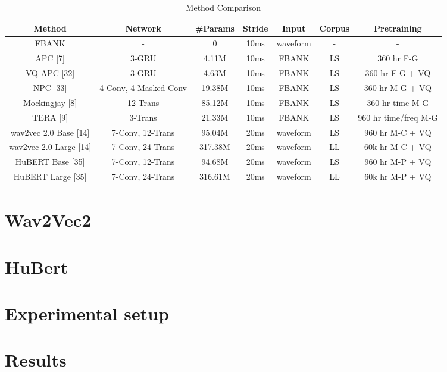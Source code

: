 \begin{table}[htbp]
    \centering
    \caption{Method Comparison}
    \label{tab:methods}
    \begin{tabular}{ccccccc}
      \toprule
      Method & Network & \#Params & Stride & Input & Corpus & Pretraining \\
      \midrule
      FBANK & - & 0 & 10ms & waveform & - & - \\
      APC [7] & 3-GRU & 4.11M & 10ms & FBANK & LS & 360 hr F-G \\
      VQ-APC [32] & 3-GRU & 4.63M & 10ms & FBANK & LS & 360 hr F-G + VQ \\
      NPC [33] & 4-Conv, 4-Masked Conv & 19.38M & 10ms & FBANK & LS & 360 hr M-G + VQ \\
      Mockingjay [8] & 12-Trans & 85.12M & 10ms & FBANK & LS & 360 hr time M-G \\
      TERA [9] & 3-Trans & 21.33M & 10ms & FBANK & LS & 960 hr time/freq M-G \\
      wav2vec 2.0 Base [14] & 7-Conv, 12-Trans & 95.04M & 20ms & waveform & LS & 960 hr M-C + VQ \\
      wav2vec 2.0 Large [14] & 7-Conv, 24-Trans & 317.38M & 20ms & waveform & LL & 60k hr M-C + VQ \\
      HuBERT Base [35] & 7-Conv, 12-Trans & 94.68M & 20ms & waveform & LS & 960 hr M-P + VQ \\
      HuBERT Large [35] & 7-Conv, 24-Trans & 316.61M & 20ms & waveform & LL & 60k hr M-P + VQ \\
      \bottomrule
    \end{tabular}
  \end{table}
\section{Wav2Vec2}
\section{HuBert}

\section{Experimental setup}
\section{Results}

